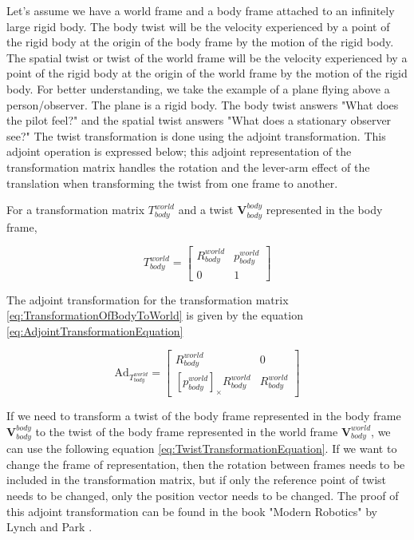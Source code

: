 \documentclass[report.tex]{subfiles}
\begin{document}
    Let's assume we have a world frame and a body frame attached to an infinitely large rigid body. The body twist will be the velocity experienced by a point of the rigid body at the origin of the body frame by the motion of the rigid body. The spatial twist or twist of the world frame will be the velocity experienced by a point of the rigid body at the origin of the world frame by the motion of the rigid body. For better understanding, we take the example of a plane flying above a person/observer. The plane is a rigid body. The body twist answers "What does the pilot feel?" and the spatial twist answers "What does a stationary observer see?" The twist transformation is done using the adjoint transformation. This adjoint operation is expressed below; this adjoint representation of the transformation matrix handles the rotation and the lever-arm effect of the translation when transforming the twist from one frame to another.

    For a transformation matrix $T_{body}^{world}$ and a twist $\boldsymbol{V}_{body}^{body}$ represented in the body frame,  

    \begin{equation}
    T_{body}^{world} = \begin{bmatrix} R_{body}^{world} & p_{body}^{world} \\ 0 & 1 \end{bmatrix}
    \label{eq:TransformationOfBodyToWorld}
    \end{equation}

    The adjoint transformation for the transformation matrix \ref{eq:TransformationOfBodyToWorld} is given by the equation \ref{eq:AdjointTransformationEquation}

    \begin{equation}
    \text{Ad}_{T_{body}^{world}} = \begin{bmatrix} R_{body}^{world} & 0 \\ [p_{body}^{world}]_\times R_{body}^{world} & R_{body}^{world} \end{bmatrix}
    \label{eq:AdjointTransformationEquation}
    \end{equation}

    If we need to transform a twist of the body frame represented in the body frame $\boldsymbol{V}_{body}^{body}$ to the twist of the body frame represented in the world frame $\boldsymbol{V}_{body}^{world}$, we can use the following equation \ref{eq:TwistTransformationEquation}. 
    If we want to change the frame of representation, then the rotation between frames needs to be included in the transformation matrix, but if only the reference point of twist needs to be changed, only the position vector needs to be changed. The proof of this adjoint transformation can be found in the book "Modern Robotics" by Lynch and Park \cite{BOOK-ModernRobotics}.
    
\end{document}

